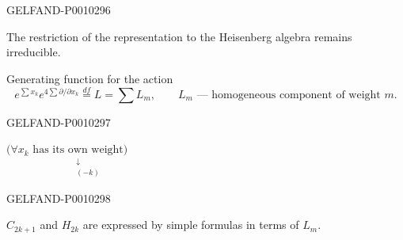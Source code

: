 \begin{GelfandAdjacentEvidence}{GELFAND-P001029}{6}


The restriction of the representation to the Heisenberg algebra remains irreducible.

Generating function for the action
\[
e^{\sum x_k}e^{4\sum\partial/\partial x_k}\overset{df}{=}L=\sum L_m,
\qquad L_m\text{ --- homogeneous component of weight }m.
\]
\end{GelfandAdjacentEvidence}
\begin{GelfandAdjacentEvidence}{GELFAND-P001029}{7}


$\bigl(\forall x_k\text{ has }\underset{\substack{\downarrow\\(-k)}}{\text{its own weight}}\bigr)$
\end{GelfandAdjacentEvidence}
\begin{GelfandAdjacentEvidence}{GELFAND-P001029}{8}

\end{GelfandAdjacentEvidence}


$C_{2k+1}$ and $H_{2k}$ are expressed by simple formulas in terms of $L_m$.



